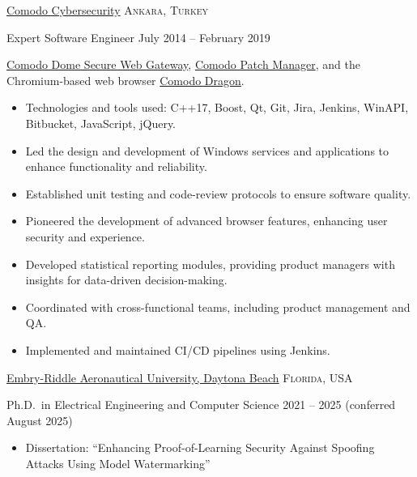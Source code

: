 \documentclass[10pt,a4paper]{article}
\begin{document}
\vspace{0.3cm}

\headedsection
{\href{https://www.comodo.com}{Comodo Cybersecurity}}
{\textsc{Ankara, Turkey}}{
    \headedsubsection
    {Expert Software Engineer}
    {July 2014 -- February 2019}
    {
        \bodytext
        {
            \href{https://cdome.comodo.com/}{Comodo Dome Secure Web Gateway}, \href{https://www.itarian.com/patch-management.php}{Comodo Patch Manager}, and the Chromium-based web browser \href{https://www.comodo.com/home/browsers-toolbars/browser.php}{Comodo Dragon}.
            \begin{itemize}
                \item Technologies and tools used: C++17, Boost, Qt, Git, Jira, Jenkins, WinAPI, Bitbucket, JavaScript, jQuery.
                \item Led the design and development of Windows services and applications to enhance functionality and reliability.
                \item Established unit testing and code-review protocols to ensure software quality.
                \item Pioneered the development of advanced browser features, enhancing user security and experience.
                \item Developed statistical reporting modules, providing product managers with insights for data-driven decision-making.
                \item Coordinated with cross-functional teams, including product management and QA.
                \item Implemented and maintained CI/CD pipelines using Jenkins.
            \end{itemize}
        }
    }
}

\spacedhrule{0.9em}{0.1em}


\headedsection
{\href{https://daytonabeach.erau.edu/}{Embry-Riddle Aeronautical University, Daytona Beach}}
{\textsc{Florida, USA}} {
    \headedsubsection
    {Ph.D.\ in Electrical Engineering and Computer Science}
    {2021 -- 2025 (conferred August 2025)}
    {
        \begin{itemize}
            \item Dissertation: ``Enhancing Proof-of-Learning Security Against Spoofing Attacks Using Model Watermarking''
        \end{itemize}
    }
}
\end{document}
